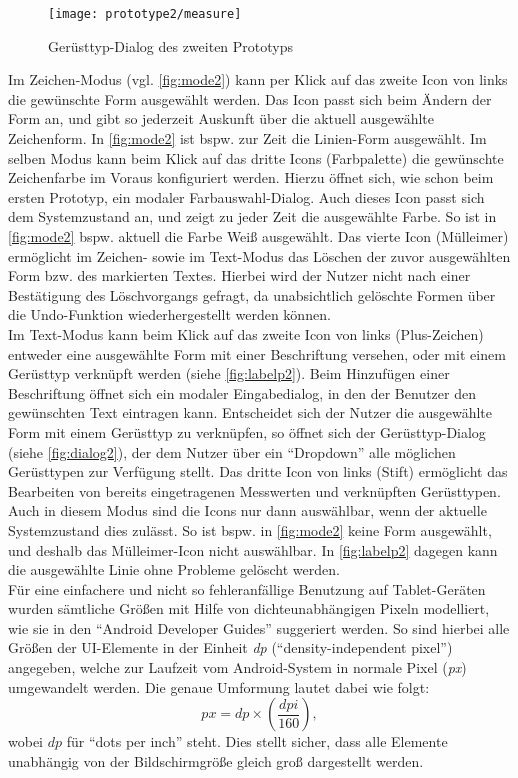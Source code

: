 \begin{wrapfigure}{R}{0.4\textwidth}
  \centering
  \texttt{[image: prototype2/measure]}
  \caption{Gerüsttyp-Dialog des zweiten Prototyps}
  \label{fig:dialog2}
\end{wrapfigure}

Im Zeichen-Modus (vgl. \autoref{fig:mode2}) kann per Klick auf das zweite Icon von links die gewünschte Form ausgewählt werden. 
Das Icon passt sich beim Ändern der Form an, und gibt so jederzeit Auskunft über die aktuell ausgewählte Zeichenform.
In \autoref{fig:mode2} ist bspw. zur Zeit die Linien-Form ausgewählt.
Im selben Modus kann beim Klick auf das dritte Icons (Farbpalette) die gewünschte Zeichenfarbe im Voraus konfiguriert werden. 
Hierzu öffnet sich, wie schon beim ersten Prototyp, ein modaler Farbauswahl-Dialog.
Auch dieses Icon passt sich dem Systemzustand an, und zeigt zu jeder Zeit die ausgewählte Farbe.
So ist in \autoref{fig:mode2} bspw. aktuell die Farbe Weiß ausgewählt.
Das vierte Icon (Mülleimer) ermöglicht im Zeichen- sowie im Text-Modus das Löschen der zuvor ausgewählten Form bzw. des markierten Textes. 
Hierbei wird der Nutzer nicht nach einer Bestätigung des Löschvorgangs gefragt, da unabsichtlich gelöschte Formen über die Undo-Funktion wiederhergestellt werden können. \\

Im Text-Modus kann beim Klick auf das zweite Icon von links (Plus-Zeichen) entweder eine ausgewählte Form mit einer Beschriftung versehen, oder mit einem Gerüsttyp verknüpft werden (siehe \autoref{fig:labelp2}).
Beim Hinzufügen einer Beschriftung öffnet sich ein modaler Eingabedialog, in den der Benutzer den gewünschten Text eintragen kann.
Entscheidet sich der Nutzer die ausgewählte Form mit einem Gerüsttyp zu verknüpfen, so öffnet sich der Gerüsttyp-Dialog (siehe \autoref{fig:dialog2}), der dem Nutzer über ein ``Dropdown'' alle möglichen Gerüsttypen zur Verfügung stellt.
Das dritte Icon von links (Stift) ermöglicht das Bearbeiten von bereits eingetragenen Messwerten und verknüpften Gerüsttypen.
Auch in diesem Modus sind die Icons nur dann auswählbar, wenn der aktuelle Systemzustand dies zulässt. 
So ist bspw. in \autoref{fig:mode2} keine Form ausgewählt, und deshalb das Mülleimer-Icon nicht auswählbar. 
In \autoref{fig:labelp2} dagegen kann die ausgewählte Linie ohne Probleme gelöscht werden. \\

Für eine einfachere und nicht so fehleranfällige Benutzung auf Tablet-Geräten wurden sämtliche Größen mit Hilfe von dichteunabhängigen Pixeln modelliert, wie sie in den ``Android Developer Guides'' suggeriert werden.
So sind hierbei alle Größen der UI-Elemente in der Einheit \emph{dp} (``density-independent pixel'') angegeben, welche zur Laufzeit vom Android-System in normale Pixel (\emph{px}) umgewandelt werden.
Die genaue Umformung lautet dabei wie folgt:
\[
  px =  dp \times (\frac{dpi}{160}),
\]
wobei $dp$ für ``dots per inch'' steht.
Dies stellt sicher, dass alle Elemente unabhängig von der Bildschirmgröße gleich groß dargestellt werden. \\

